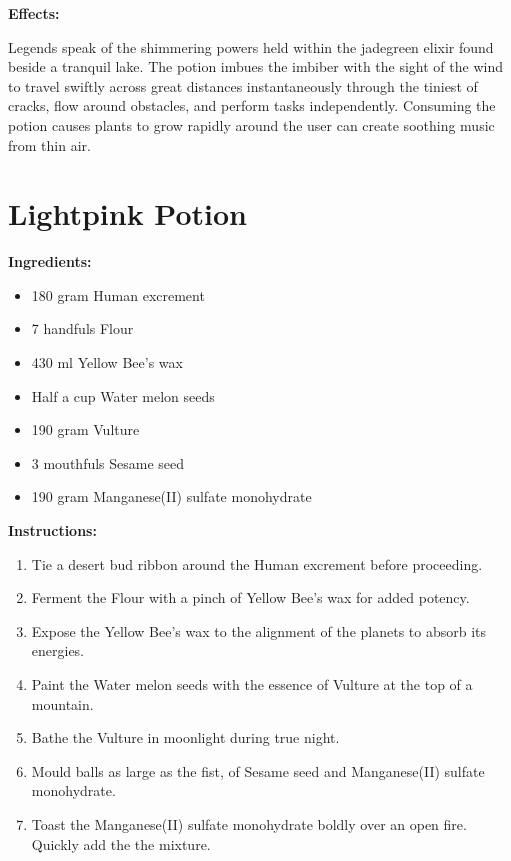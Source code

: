 \documentclass{article}
\begin{document}
\textbf{Effects:}

Legends speak of the shimmering powers held within the jadegreen elixir found beside a tranquil lake. The potion imbues the imbiber with the sight of the wind to travel swiftly across great distances instantaneously through the tiniest of cracks, flow around obstacles, and perform tasks independently. Consuming the potion causes plants to grow rapidly around the user can create soothing music from thin air.

\newpage
\section*{Lightpink Potion}

\textbf{Ingredients:}

\begin{itemize}
  \item 180 gram Human excrement
  \item 7 handfuls Flour
  \item 430 ml Yellow Bee's wax
  \item Half a cup Water melon seeds
  \item 190 gram Vulture
  \item 3 mouthfuls Sesame seed
  \item 190 gram Manganese(II) sulfate monohydrate
\end{itemize}

\textbf{Instructions:}

\begin{enumerate}
  \item Tie a desert bud ribbon around the Human excrement before proceeding.
  \item Ferment the Flour with a pinch of Yellow Bee's wax for added potency.
  \item Expose the Yellow Bee's wax to the alignment of the planets to absorb its energies.
  \item Paint the Water melon seeds with the essence of Vulture at the top of a mountain.
  \item Bathe the Vulture in moonlight during true night.
  \item Mould balls as large as the fist, of Sesame seed and Manganese(II) sulfate monohydrate.
  \item Toast the Manganese(II) sulfate monohydrate boldly over an open fire. Quickly add the the mixture.
\end{enumerate}
\end{document}
